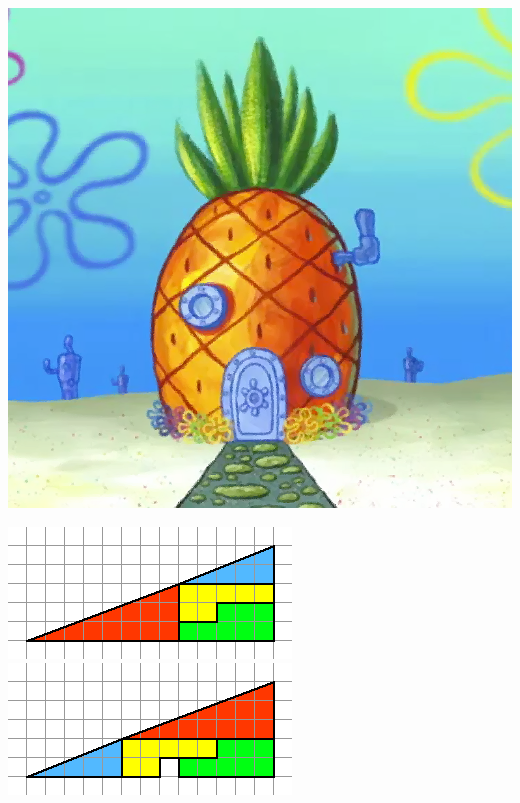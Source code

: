 \documentclass[a4paper,ngerman,landscape]{scrartcl}
\begin{document}
\begin{center}
  \vspace*{1.5em}
  \includegraphics[height=0.9\textheight]{spongebob-ananas}
  \begin{minipage}[b]{0.25\textwidth}
  \includegraphics[width=\textwidth]{ein-kaestchen-verschwindet-1}
  \includegraphics[width=\textwidth]{ein-kaestchen-verschwindet-2}


\end{minipage}
\end{center}
\end{document}
